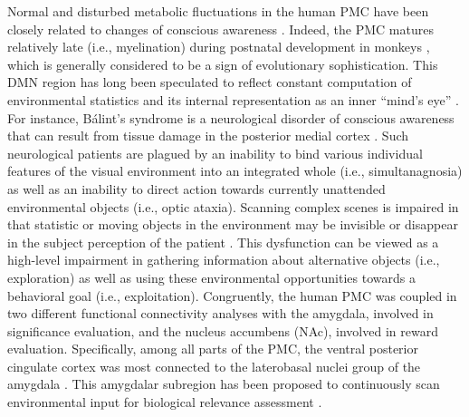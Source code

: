 \documentclass[10pt,letterpaper]{article}
\begin{document}
Normal and disturbed metabolic fluctuations in the
human PMC have been closely related to
changes of conscious awareness \citep{cavanna2006precuneus, leech_pcc2014}.
Indeed,
the PMC matures relatively late (i.e., myelination) during postnatal development in monkeys
\citep{goldman1987development}, which is generally considered to
be a sign of evolutionary sophistication.
%
This DMN region has long been speculated to
reflect constant computation of
environmental statistics and its internal representation
as an inner ``mind's eye'' \citep{cavanna2006precuneus, leech_pcc2014}.
For instance, B\'alint's syndrome is a neurological disorder of conscious
awareness that can result from tissue damage in the posterior medial cortex
\citep{balint1909seelenlahmung, randy2008}.
Such neurological patients are plagued by an
inability to bind various individual features of the visual
environment into an integrated whole (i.e., simultanagnosia)
as well as an inability to direct action towards
currently unattended environmental objects
(i.e., optic ataxia).
%
Scanning complex scenes is impaired in that statistic or moving objects in the
environment may be invisible or disappear in the subject perception of the
patient \citep{mesulam_book, blumenfeld_book}.
%
This dysfunction can be viewed as a high-level impairment in gathering
information about alternative objects (i.e., exploration) as well as
using these environmental opportunities towards a behavioral goal (i.e., exploitation).
Congruently,
the human PMC was coupled in two different functional connectivity analyses
\citep{bzdok2015subspecialization}
with the amygdala, involved in significance evaluation, and
the nucleus accumbens (NAc), involved in reward evaluation.
Specifically, among all parts of the PMC,
the ventral posterior cingulate cortex was
most connected to the laterobasal
nuclei group of the amygdala
\citep{bzdok2015subspecialization}.
This amygdalar subregion has been proposed to
continuously scan environmental input
for biological relevance assessment
\citep{amygdala_bzdok, ghods2009fundamental, baxter2002amygdala}.
\end{document}
